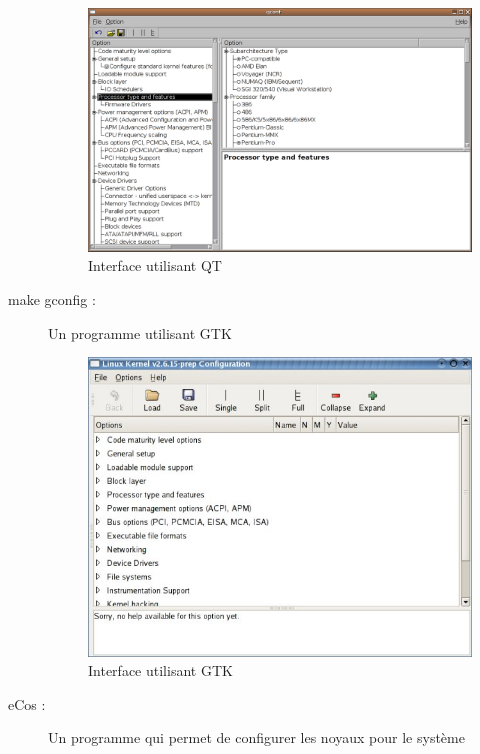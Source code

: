 ﻿\documentclass[17pts]{report}
\begin{document}
\begin{description}
        \begin{figure}[H]
            \includegraphics[scale=0.4]{illustrations/xconfig.png}
            \centering
            \caption{Interface utilisant QT}
            \label{fig:MakeXconfig}
        \end{figure}
        \pagebreak
\item[make gconfig :]             Un programme utilisant GTK \\
        \begin{figure}[H]
            \includegraphics[scale=0.9]{illustrations/gconfig.jpg}
            \centering
            \caption{Interface utilisant GTK}
            \label{fig:MakeGconfig}
        \end{figure}
    \item[eCos :] Un programme qui permet de configurer les noyaux pour le système

\end{description}
\end{document}
